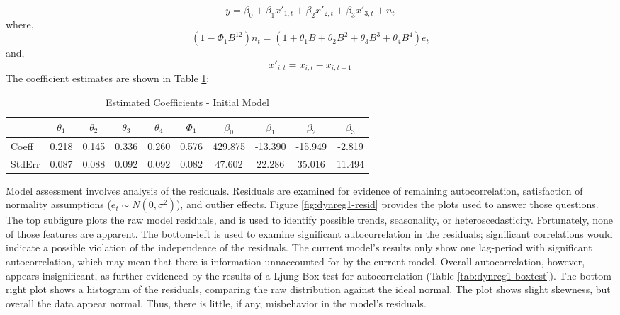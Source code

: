 \documentclass[12pt,letterpaper,toc=flat,oneside]{report}
\theoremstyle{definition}
\theoremstyle{definition}
\theoremstyle{definition}
\theoremstyle{remark}
\begin{document}
\[ y = \beta_0 + \beta_1x'_{1,t} + \beta_2x'_{2,t} + \beta_3x'_{3,t} + n_t\]
where,
\[ (1-\Phi_1 B^{12})n_t = (1 + \theta_1B + \theta_2B^2 + \theta_3B^3 + \theta_4 B^4)e_t \]
and, \[ x'_{i,t} = x_{i,t} - x_{i,t-1}\] The coefficient estimates are
shown in Table \ref{tab:dynreg1-coeff}:

\begin{table}[!h]

\caption{\label{tab:dynreg1-coeff}Estimated Coefficients - Initial Model}
\centering
\begin{tabular}[t]{lccccccccc}
\toprule
\bfseries{ } & \bfseries{$\theta_1$} & \bfseries{$\theta_2$} & \bfseries{$\theta_3$} & \bfseries{$\theta_4$} & \bfseries{$\Phi_1$} & \bfseries{$\beta_0$} & \bfseries{$\beta_1$} & \bfseries{$\beta_2$} & \bfseries{$\beta_3$}\\
\midrule
Coeff & 0.218 & 0.145 & 0.336 & 0.260 & 0.576 & 429.875 & -13.390 & -15.949 & -2.819\\
StdErr & 0.087 & 0.088 & 0.092 & 0.092 & 0.082 & 47.602 & 22.286 & 35.016 & 11.494\\
\bottomrule
\end{tabular}
\end{table}

Model assessment involves analysis of the residuals. Residuals are
examined for evidence of remaining autocorrelation, satisfaction of
normality assumptions (\(e_t \sim N(0,\sigma^2)\)), and outlier effects.
Figure \ref{fig:dynreg1-resid} provides the plots used to answer those
questions. The top subfigure plots the raw model residuals, and is used
to identify possible trends, seasonality, or heteroscedasticity.
Fortunately, none of those features are apparent. The bottom-left is
used to examine significant autocorrelation in the residuals;
significant correlations would indicate a possible violation of the
independence of the residuals. The current model's results only show one
lag-period with significant autocorrelation, which may mean that there
is information unnaccounted for by the current model. Overall
autocorrelation, however, appears insignificant, as further evidenced by
the results of a Ljung-Box test for autocorrelation (Table
\ref{tab:dynreg1-boxtest}). The bottom-right plot shows a histogram of
the residuals, comparing the raw distribution against the ideal normal.
The plot shows slight skewness, but overall the data appear normal.
Thus, there is little, if any, misbehavior in the model's residuals.
\end{document}
